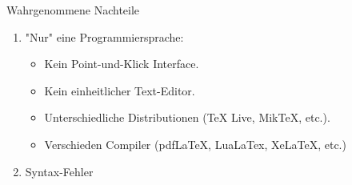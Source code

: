 





\begin{frame}{Wahrgenommene Nachteile}
	\begin{enumerate}[<+-|alert@+>]
		\item "Nur" eine Programmiersprache:
		      \begin{itemize}
                    \item Kein Point-und-Klick Interface.
                    \item Kein einheitlicher Text-Editor.
                    \item Unterschiedliche Distributionen (TeX Live, MikTeX, etc.).
                    \item Verschieden Compiler (pdfLaTeX, LuaLaTex, XeLaTeX, etc.)
		      \end{itemize}
        \item Syntax-Fehler
	\end{enumerate}
\end{frame}
